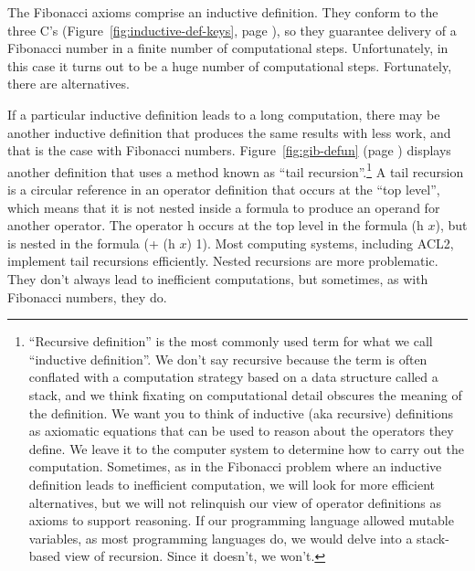 The Fibonacci axioms comprise an
inductive definition.
They conform to the three C's
(Figure~\ref{fig:inductive-def-keys}, page \pageref{fig:inductive-def-keys}),
so they guarantee delivery of a Fibonacci number
in a finite number of computational steps.
Unfortunately, in this case it turns out to be
a huge number of computational steps.
Fortunately, there are alternatives.

If a particular inductive definition leads to a long computation,
there may be another inductive definition that produces the same
results with less work,
and that is the case with Fibonacci numbers.
Figure~\ref{fig:gib-defun} (page \pageref{fig:gib-defun})
displays another definition that uses a method known as
``tail recursion''.\footnote{``Recursive definition''
is the most commonly used term for what we call ``inductive definition''.
We don't say recursive because the term is often conflated
with a computation strategy based on a data structure called a stack,
and we think fixating on computational detail obscures the meaning
of the definition.
We want you to think of inductive (aka recursive)
definitions as axiomatic equations that can be used to reason about the
operators they define. We leave it to the computer system
to determine how to carry out the computation.
Sometimes, as in the Fibonacci problem
where an inductive definition leads to inefficient computation,
we will look for more efficient alternatives,
but we will not relinquish our view of operator definitions
as axioms to support reasoning. If our programming language allowed
mutable variables, as most programming languages do, we would
delve into a stack-based view of recursion.
Since it doesn't, we won't.}
A tail recursion is a circular reference in an operator definition
that occurs at the
``top level'',
which means that it is not nested
inside a formula to produce an operand for
another operator. The operator \textsf{h} occurs at the top level
in the formula \textsf{(h $x$)},
but is nested in the formula \textsf{(+ (h $x$) 1)}.
Most computing systems, including ACL2,
implement tail recursions efficiently. Nested recursions are
more problematic. They don't always lead to inefficient computations,
but sometimes, as with Fibonacci numbers, they do.

